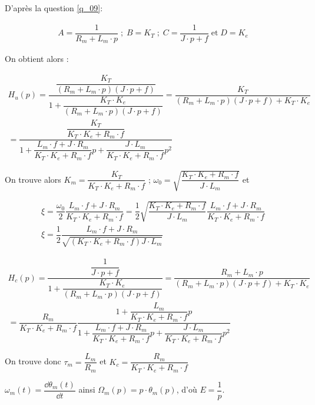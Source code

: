\begin{corrige}
D'après la question \ref{q_09}: 

\begin{align*}
A=\dfrac{1}{R_m+L_m\cdot p} \;;\; B=K_T\;;\;C=\dfrac{1}{J\cdot p+f}\;\text{et} \;D=K_e
\end{align*}

On obtient alors : 

\begin{align*}
H_u(p)=\dfrac{\dfrac{K_T}{\left(R_m+L_m\cdot p\right)\left(J\cdot p+f\right)}}{1+\dfrac{K_T\cdot K_e}{\left(R_m+L_m\cdot p\right)\left(J\cdot p+f\right)}}
=\dfrac{K_T}{\left(R_m+L_m\cdot p\right)\left(J\cdot p+f\right)+K_T\cdot K_e}\\
=\dfrac{\dfrac{K_T}{K_T\cdot K_e+R_m\cdot f}}{1+\dfrac{L_m\cdot f+J\cdot R_m}{K_T\cdot K_e+R_m\cdot f}p+\dfrac{J\cdot L_m}{K_T\cdot K_e+R_m\cdot f}p^2}
\end{align*}

On trouve alors $K_m=\dfrac{K_T}{K_T\cdot K_e+R_m\cdot f}$ ; $\omega_0=\sqrt{\dfrac{K_T\cdot K_e+R_m\cdot f}{J\cdot L_m}}$ et

\begin{align*}
\xi=\dfrac{\omega_0}{2}\dfrac{L_m\cdot f+J\cdot R_m}{K_T\cdot K_e+R_m\cdot f}=\dfrac{1}{2}\sqrt{\dfrac{K_T\cdot K_e+R_m\cdot f}{J\cdot L_m}}\dfrac{L_m\cdot f+J\cdot R_m}{K_T\cdot K_e+R_m\cdot f}\\
\xi=\dfrac{1}{2}\dfrac{L_m\cdot f+J\cdot R_m}{\sqrt{\left(K_T\cdot K_e+R_m\cdot f\right)J\cdot L_m}}
\end{align*}

\begin{align*}
H_c(p)=\dfrac{\dfrac{1}{J\cdot p+f}}{1+\dfrac{K_T\cdot K_e}{\left(R_m+L_m\cdot p\right)\left(J\cdot p+f\right)}}
=\dfrac{R_m+L_m\cdot p}{\left(R_m+L_m\cdot p\right)\left(J\cdot p+f\right)+K_T\cdot K_e}\\
=\dfrac{R_m}{K_T\cdot K_e+R_m\cdot f}\dfrac{1+\dfrac{L_m}{K_T\cdot K_e+R_m\cdot f}p}{1+\dfrac{L_m\cdot f+J\cdot R_m}{K_T\cdot K_e+R_m\cdot f}p+\dfrac{J\cdot L_m}{K_T\cdot K_e+R_m\cdot f}p^2}
\end{align*}

On trouve donc $\tau_m=\dfrac{L_m}{R_m}$ et $K_c=\dfrac{R_m}{K_T\cdot K_e+R_m\cdot f}$
\end{corrige}
\else
\fi

\ifprof
\begin{corrige}
$\omega_m(t)=\dfrac{\dd \theta_m(t)}{\dd t}$ ainsi $\Omega_m(p)=p\cdot \theta_m(p)$, d'où $E=\dfrac{1}{p}$.
\end{corrige}
\else
\fi

